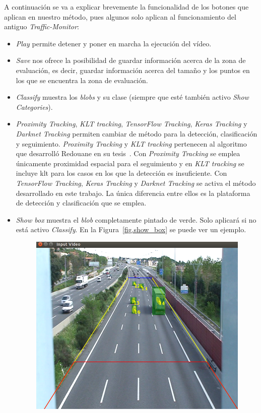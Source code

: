 A continuación se va a explicar brevemente la funcionalidad de los botones que aplican en nuestro método, pues algunos solo aplican al funcionamiento del antiguo \textit{Traffic-Monitor}:
\begin{itemize}
    \item \textit{Play} permite detener y poner en marcha la ejecución del vídeo.
    \item \textit{Save} nos ofrece la posibilidad de guardar información acerca de la zona de evaluación, es decir, guardar información acerca del tamaño y los puntos en los que se encuentra la zona de evaluación.
    \item \textit{Classify} muestra los \textit{blobs} y su clase (siempre que esté también activo \textit{Show Categories}).
    \item \textit{Proximity Tracking}, \textit{KLT tracking}, \textit{TensorFlow Tracking}, \textit{Keras Tracking} y \textit{Darknet Tracking} permiten cambiar de método para la detección, clasificación y seguimiento. \textit{Proximity Tracking} y \textit{KLT tracking} pertenecen al algoritmo que desarrolló Redouane en su tesis~\cite{redo_tesis}. Con \textit{Proximity Tracking} se emplea únicamente proximidad espacial para el seguimiento y en \textit{KLT tracking} se incluye \acrshort{klt} para los casos en los que la detección es insuficiente. Con \textit{TensorFlow Tracking}, \textit{Keras Tracking} y \textit{Darknet Tracking} se activa el método desarrollado en este trabajo. La única diferencia entre ellos es la plataforma de detección y clasificación que se emplea.
    \item \textit{Show box} muestra el \textit{blob} completamente pintado de verde. Solo aplicará si no está activo \textit{Classify}. En la Figura~\ref{fig.show_box} se puede ver un ejemplo.
        \begin{figure}[H] 
    \begin{center}
    	\includegraphics[scale=0.35]{figures/Diseno_global/show_box.png}

\end{center}
\end{figure}
\end{itemize}
